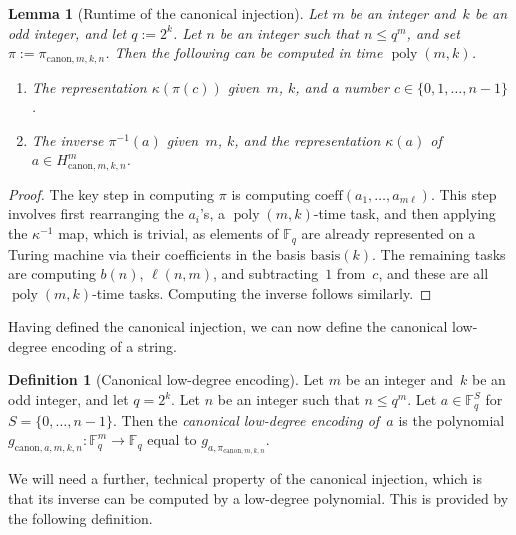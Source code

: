 \documentclass[11pt]{article}
\newtheorem{lemma}[theorem]{Lemma}
\theoremstyle{definition}
\newtheorem{definition}[theorem]{Definition}
\newcommand{\F}{\ensuremath{\mathbb{F}}}
\newcommand{\downsize}{\kappa}
\DeclareMathOperator{\poly}{poly}
\newcommand{\canbasis}[1]{\mathrm{basis}(#1)}
\newcommand{\canH}[3]{H_{\mathrm{canon}, #1, #2, #3}}
\newcommand{\canin}[3]{\pi_{\mathrm{canon},#1,#2,#3}}
\newcommand{\canenc}[4]{g_{\mathrm{canon},#1,#2,#3,#4}}
\begin{document}
\begin{lemma}[Runtime of the canonical injection]
  \label{lem:canonical-injection-complexity}
  Let $m$ be an integer and~$k$ be an odd integer, and let $q := 2^k$.
  Let $n$ be an integer such that $n \le q^m$, and set $\pi :=
  \canin{m}{k}{n}$.
  Then the following can be computed in time $\poly(m, k)$.
  \begin{enumerate}
  \item The representation $\downsize(\pi(c))$ given~$m$, $k$, and a number $c
    \in \{0, 1, \ldots, n-1\}$.
  \item The inverse $\pi^{-1}(a)$ given~$m$, $k$, and the representation
    $\kappa(a)$ of $a \in \canH{m}{k}{n}^m$.
  \end{enumerate}
\end{lemma}

\begin{proof}
  The key step in computing $\pi$ is computing $\mathrm{coeff}(a_1, \ldots,
  a_{m\ell})$.
  This step involves first rearranging the $a_i$'s, a $\poly(m, k)$-time task,
  and then applying the $\downsize^{-1}$ map, which is trivial, as elements of
  $\F_q$ are already represented on a Turing machine via their coefficients in
  the basis $\canbasis{k}$.
  The remaining tasks are computing $b(n)$, $\ell(n, m)$, and subtracting~$1$
  from~$c$, and these are all $\poly(m, k)$-time tasks.
  Computing the inverse follows similarly.
\end{proof}

Having defined the canonical injection, we can now define the canonical
low-degree encoding of a string.

\begin{definition}[Canonical low-degree encoding]
  \label{def:ld-encoding}
  Let $m$ be an integer and~$k$ be an odd integer, and let $q = 2^k$.
  Let $n$ be an integer such that $n \le q^m$.
  Let $a \in \F_q^S$ for $S = \{0, \ldots, n-1\}$.
  Then the \emph{canonical low-degree encoding of~$a$} is the polynomial
  $\canenc{a}{m}{k}{n} : \F_q^m \rightarrow \F_q$ equal to $g_{a,
    \canin{m}{k}{n}}$.
\end{definition}

We will need a further, technical property of the canonical injection,
which is that its inverse can be computed by a low-degree polynomial.
This is provided by the following definition.
\end{document}
